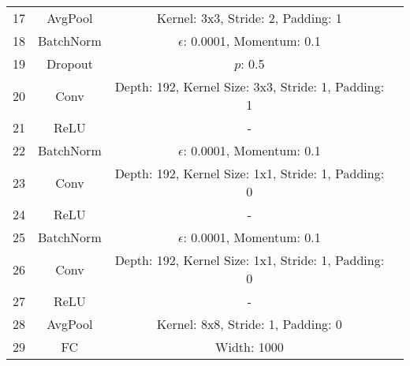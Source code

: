 \documentclass[10pt,twocolumn,letterpaper]{article}
\begin{document}
\begin{table}[ht]
\begin{tabular}{|l|c|c|r}
        \multirow{1}{0.5cm}{17} & AvgPool & Kernel: 3x3, Stride: 2, Padding: 1\\
        
        \multirow{1}{0.5cm}{18} & BatchNorm & $\epsilon$: 0.0001, Momentum: 0.1\\
        \multirow{1}{0.5cm}{19} & Dropout & $p$: 0.5\\
        \multirow{1}{0.5cm}{20} & Conv & Depth: 192, Kernel Size: 3x3, Stride: 1, Padding: 1\\
        \multirow{1}{0.5cm}{21} & ReLU & -\\
        
        \multirow{1}{0.5cm}{22} & BatchNorm & $\epsilon$: 0.0001, Momentum: 0.1\\
        \multirow{1}{0.5cm}{23} & Conv & Depth: 192, Kernel Size: 1x1, Stride: 1, Padding: 0\\
        \multirow{1}{0.5cm}{24} & ReLU & -\\
        
        \multirow{1}{0.5cm}{25} & BatchNorm & $\epsilon$: 0.0001, Momentum: 0.1\\
        \multirow{1}{0.5cm}{26} & Conv & Depth: 192, Kernel Size: 1x1, Stride: 1, Padding: 0\\
        \multirow{1}{0.5cm}{27} & ReLU & -\\
        
        \multirow{1}{0.5cm}{28} & AvgPool & Kernel: 8x8, Stride: 1, Padding: 0\\
        \multirow{1}{0.5cm}{29} & FC & Width: 1000\\
        
        \hline
        

        \hline
        \bottomrule
    \end{tabular}
    \label{table:var_nin}
    \vspace{-2mm}
\end{table}
\end{document}
